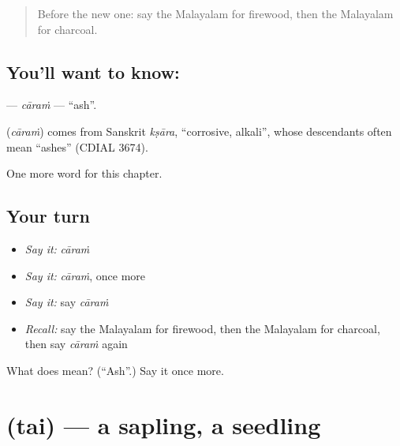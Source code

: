 \label{lesson:ML-C332-caram}



\begin{quote}
Before the new one: say the Malayalam for firewood, then the Malayalam for charcoal.
\end{quote}

\subsection*{You'll want to know: }
\textbf{} — \emph{cāraṁ} — \textquotedblleft{}ash\textquotedblright{}.

\begin{cousinweb}
\textbf{} (\emph{cāraṁ}) comes from Sanskrit \emph{kṣāra}, \textquotedblleft{}corrosive, alkali\textquotedblright{}, whose descendants often mean \textquotedblleft{}ashes\textquotedblright{} (CDIAL 3674).
\end{cousinweb}

\begin{grammarlens}[title={What you've built}]
One more word for this chapter.
\end{grammarlens}

\subsection*{Your turn}
\begin{itemize}
\raggedright
  \item \emph{Say it:} \emph{cāraṁ}
  \item \emph{Say it:} \emph{cāraṁ}, once more
  \item \emph{Say it:} say \emph{cāraṁ}
  \item \emph{Recall:} say the Malayalam for firewood, then the Malayalam for charcoal, then say \emph{cāraṁ} again
\end{itemize}

\begin{tcolorbox}[breakable,colback=teal!4,colframe=teal!35!black,title={Before you move on}]
What does  mean? (\textquotedblleft{}Ash\textquotedblright{}.) Say it once more.
\end{tcolorbox}
\section[\texorpdfstring{\ml{തൈ} (tai)}{തൈ (tai)}]{ (tai) — a sapling, a seedling}

\label{lesson:ML-C332-tai}



